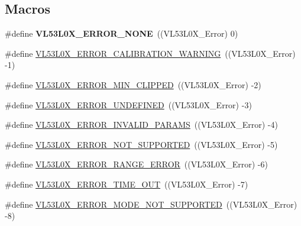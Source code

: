 \subsection*{Macros}
\begin{DoxyCompactItemize}
\item 
\mbox{\label{group__VL53L0X__define__Error__group_gab1bcfe4c791fa91012ccf489a260430a}} 
\#define {\bfseries V\+L53\+L0\+X\+\_\+\+E\+R\+R\+O\+R\+\_\+\+N\+O\+NE}~((V\+L53\+L0\+X\+\_\+\+Error)    0)
\item 
\#define \hyperlink{group__VL53L0X__define__Error__group_ga4bc7046c2d7a01b8c925af91d5325a65}{V\+L53\+L0\+X\+\_\+\+E\+R\+R\+O\+R\+\_\+\+C\+A\+L\+I\+B\+R\+A\+T\+I\+O\+N\+\_\+\+W\+A\+R\+N\+I\+NG}~((V\+L53\+L0\+X\+\_\+\+Error) -\/1)
\item 
\#define \hyperlink{group__VL53L0X__define__Error__group_gaada0c813c38a4ec7a6b75646fe26129c}{V\+L53\+L0\+X\+\_\+\+E\+R\+R\+O\+R\+\_\+\+M\+I\+N\+\_\+\+C\+L\+I\+P\+P\+ED}~((V\+L53\+L0\+X\+\_\+\+Error) -\/2)
\item 
\#define \hyperlink{group__VL53L0X__define__Error__group_ga11002b39ce656b5b10bc0a9b8806e621}{V\+L53\+L0\+X\+\_\+\+E\+R\+R\+O\+R\+\_\+\+U\+N\+D\+E\+F\+I\+N\+ED}~((V\+L53\+L0\+X\+\_\+\+Error) -\/3)
\item 
\#define \hyperlink{group__VL53L0X__define__Error__group_ga445688d58f59b8d30c1a2a535522b22b}{V\+L53\+L0\+X\+\_\+\+E\+R\+R\+O\+R\+\_\+\+I\+N\+V\+A\+L\+I\+D\+\_\+\+P\+A\+R\+A\+MS}~((V\+L53\+L0\+X\+\_\+\+Error) -\/4)
\item 
\#define \hyperlink{group__VL53L0X__define__Error__group_ga0f02dc370a804f2ab8ed226ba8f0388f}{V\+L53\+L0\+X\+\_\+\+E\+R\+R\+O\+R\+\_\+\+N\+O\+T\+\_\+\+S\+U\+P\+P\+O\+R\+T\+ED}~((V\+L53\+L0\+X\+\_\+\+Error) -\/5)
\item 
\#define \hyperlink{group__VL53L0X__define__Error__group_gafa1f517e9210b3512504ce52c4028447}{V\+L53\+L0\+X\+\_\+\+E\+R\+R\+O\+R\+\_\+\+R\+A\+N\+G\+E\+\_\+\+E\+R\+R\+OR}~((V\+L53\+L0\+X\+\_\+\+Error) -\/6)
\item 
\#define \hyperlink{group__VL53L0X__define__Error__group_gaa528340d4b96f424260552676582badc}{V\+L53\+L0\+X\+\_\+\+E\+R\+R\+O\+R\+\_\+\+T\+I\+M\+E\+\_\+\+O\+UT}~((V\+L53\+L0\+X\+\_\+\+Error) -\/7)
\item 
\#define \hyperlink{group__VL53L0X__define__Error__group_ga5aaf023be40d7fa0514abdae67d49f10}{V\+L53\+L0\+X\+\_\+\+E\+R\+R\+O\+R\+\_\+\+M\+O\+D\+E\+\_\+\+N\+O\+T\+\_\+\+S\+U\+P\+P\+O\+R\+T\+ED}~((V\+L53\+L0\+X\+\_\+\+Error) -\/8)

\end{DoxyCompactItemize}

